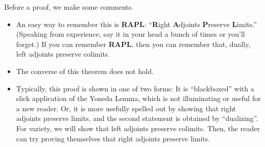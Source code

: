     Before a proof, we make some comments. 
    \begin{itemize}
        \item An easy way to remember this is \textbf{RAPL}: ``\textbf{R}ight \textbf{A}djoints \textbf{P}reserve \textbf{L}imits.'' 
        (Speaking from experience, say it in your head a bunch of times or you'll forget.) 
        If you can remember \textbf{RAPL}, then you can 
        remember that, dually, left adjoints preserve colimits. 

        \item The converse of this theorem does not hold.
        
        \item Typically, this proof is shown in one of two forms: It is ``blackboxed'' with 
        a slick application of the Yoneda Lemma, which is not illuminating or useful for a new 
        reader. Or, it is more usefully spelled out by showing that right adjoints preserve limits, and 
        the second statement is obtained by ``dualizing''. For variety, we will
        show that left adjoints preserve 
        colimits. Then, the reader can 
        try proving themselves that right adjoints preserve 
        limits.
    \end{itemize}

